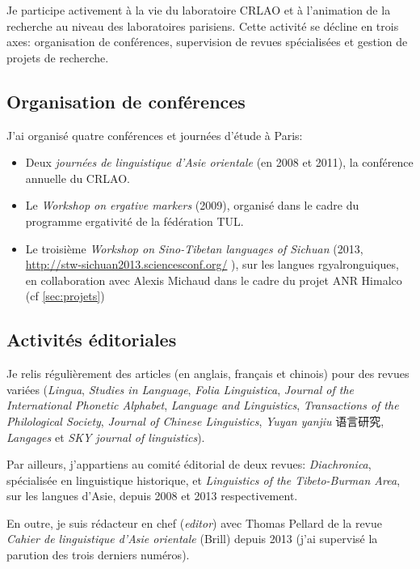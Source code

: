 \documentclass[oldfontcommands,oneside,a4paper,11pt]{article}
\newcommand{\zh}[1]{{\cn #1}}
\begin{document}
Je participe activement à la vie du laboratoire CRLAO et à l'animation de la recherche au niveau des laboratoires parisiens. Cette activité se décline en trois axes: organisation de conférences, supervision de revues spécialisées et gestion de projets de recherche.

\subsection{Organisation de conférences} \label{sec:conf}

J'ai organisé quatre conférences et journées d'étude à Paris:

\begin{itemize}
\item Deux \textit{journées de linguistique d'Asie orientale} (en 2008 et 2011), la conférence annuelle du CRLAO.
\item Le \textit{Workshop on ergative markers} (2009), organisé dans le cadre du programme ergativité de la fédération TUL.
\item Le troisième \textit{Workshop on Sino-Tibetan languages of Sichuan} (2013,    \url{http://stw-sichuan2013.sciencesconf.org/} ), sur les langues rgyalronguiques, en collaboration avec Alexis Michaud dans le cadre du projet ANR Himalco (cf \ref{sec:projets})
 
\end{itemize}



\subsection{Activités éditoriales}\label{sec:editorial}
Je relis régulièrement des articles (en anglais, français et chinois) pour des revues variées (\textit{Lingua}, \textit{Studies in Language}, \textit{Folia Linguistica}, \textit{Journal of the International Phonetic Alphabet},  \textit{Language and Linguistics}, \textit{Transactions of the Philological Society}, \textit{Journal of Chinese Linguistics}, \textit{Yuyan yanjiu} \zh{语言研究}, \textit{Langages} et  \textit{SKY journal of linguistics}).

Par ailleurs, j'appartiens au comité éditorial de deux revues: \textit{Diachronica}, spécialisée en linguistique historique, et \textit{Linguistics of the Tibeto-Burman Area}, sur les langues d'Asie, depuis 2008 et 2013 respectivement.

En outre, je suis rédacteur en chef (\textit{editor}) avec Thomas Pellard de la revue  \textit{Cahier de linguistique d'Asie orientale} (Brill) depuis 2013 (j'ai supervisé la parution des trois derniers numéros). 
\end{document}
